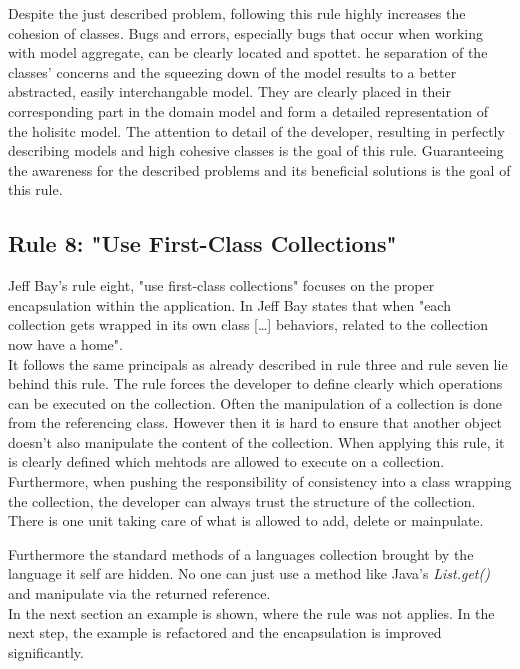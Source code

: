 Despite the just described problem, following this rule highly increases the cohesion of classes. Bugs and errors, especially bugs that occur when working with model aggregate, can be clearly located and spottet. he separation of the classes' concerns and the squeezing down of the model results to a better abstracted, easily interchangable model. They are clearly placed in their corresponding part in the domain model and form a detailed representation of the holisitc model. The attention to detail of the developer, resulting in perfectly describing models and high cohesive classes is the goal of this rule. Guaranteeing the awareness for the described problems and its beneficial solutions is the goal of this rule. 

\subsection*{Rule 8: "Use First-Class Collections"}
Jeff Bay's rule eight, "use first-class collections" focuses on the proper encapsulation within the application. In \cite{oc2008} Jeff Bay states that when "each collection gets wrapped in its own class [\dots{}] behaviors, related to the collection now have a home". 
\\

It follows the same principals as already described in rule three and rule seven lie behind this rule. The rule forces the developer to define clearly which operations can be executed on the collection. Often the manipulation of a collection is done from the referencing class. However then it is hard to ensure that another object doesn't also manipulate the content of the collection. When applying this rule, it is clearly defined which mehtods are allowed to execute on a collection. Furthermore, when pushing the responsibility of consistency into a class wrapping the collection, the developer can always trust the structure of the collection. There is one unit taking care of what is allowed to add, delete or mainpulate. 

Furthermore the standard methods of a languages collection brought by the language it self are hidden. No one can just use a method like Java's \textit{List.get()} and manipulate via the returned reference. 
\\

In the next section an example is shown, where the rule was not applies. In the next step, the example is refactored and the encapsulation is improved significantly. 
\\

